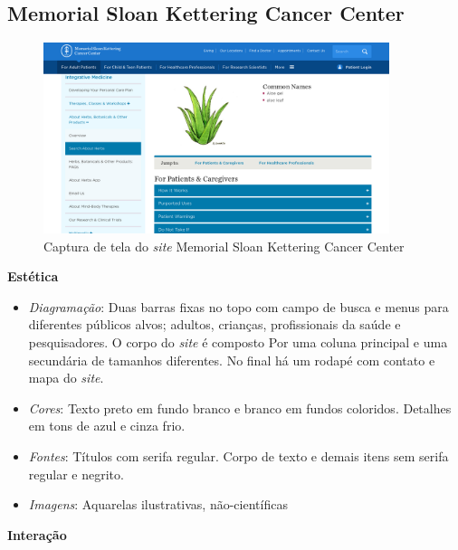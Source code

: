 \subsection{Memorial Sloan Kettering Cancer Center}\label{memorial-sloan-kettering-cancer-center}

\begin{figure}
\centering
\caption{\label{fig-mskcc}Captura de tela do \emph{site} Memorial Sloan Kettering Cancer Center}
\includegraphics[width=0.9\textwidth]{images/similares/mskcc.png}
\end{figure}

\textbf{Estética}

\begin{itemize}
\item
  \emph{Diagramação}: Duas barras fixas no topo com campo de busca e menus para diferentes públicos alvos; adultos, crianças, profissionais da saúde e pesquisadores. O corpo do \emph{site} é composto Por uma coluna principal e uma secundária de tamanhos diferentes. No final há um rodapé com contato e mapa do \emph{site}.
\item
  \emph{Cores}: Texto preto em fundo branco e branco em fundos coloridos. Detalhes em tons de azul e cinza frio.
\item
  \emph{Fontes}: Títulos com serifa regular. Corpo de texto e demais itens sem serifa regular e negrito.
\item
  \emph{Imagens}: Aquarelas ilustrativas, não-científicas
\end{itemize}

\textbf{Interação}

